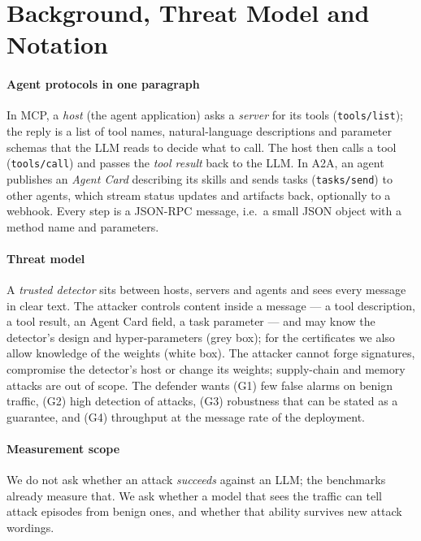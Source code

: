 \documentclass[conference,compsoc]{IEEEtran}
\begin{document}
\section{Background, Threat Model and Notation}
\label{sec:bg}
\paragraph{Agent protocols in one paragraph} In MCP, a \emph{host} (the agent application) asks a \emph{server} for its tools (\texttt{tools/list}); the reply is a list of tool names, natural-language descriptions and parameter schemas that the LLM reads to decide what to call. The host then calls a tool (\texttt{tools/call}) and passes the \emph{tool result} back to the LLM. In A2A, an agent publishes an \emph{Agent Card} describing its skills and sends tasks (\texttt{tasks/send}) to other agents, which stream status updates and artifacts back, optionally to a webhook. Every step is a JSON-RPC message, i.e.\ a small JSON object with a method name and parameters.

\paragraph{Threat model} A \emph{trusted detector} sits between hosts, servers and agents and sees every message in clear text. The attacker controls content inside a message --- a tool description, a tool result, an Agent Card field, a task parameter --- and may know the detector's design and hyper-parameters (grey box); for the certificates we also allow knowledge of the weights (white box). The attacker cannot forge signatures, compromise the detector's host or change its weights; supply-chain and memory attacks are out of scope. The defender wants (G1) few false alarms on benign traffic, (G2) high detection of attacks, (G3) robustness that can be stated as a guarantee, and (G4) throughput at the message rate of the deployment.

\paragraph{Measurement scope} We do not ask whether an attack \emph{succeeds} against an LLM; the benchmarks already measure that. We ask whether a model that sees the traffic can tell attack episodes from benign ones, and whether that ability survives new attack wordings.
\end{document}
